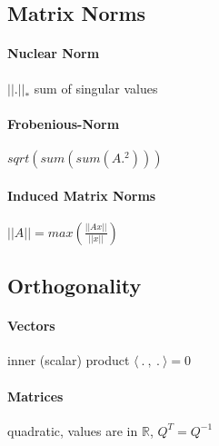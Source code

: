 \documentclass[a4paper,11pt,twocolumn]{article}
\begin{document}
\subsection{Matrix Norms}

\paragraph{Nuclear Norm} $|| . ||_*$ sum of singular values


\paragraph{Frobenious-Norm} $sqrt(sum(sum(A.^2)))$



\paragraph{Induced Matrix Norms}
$ ||A|| = max \left( \frac{ ||Ax|| }{ ||x|| } \right)$

\subsection{Orthogonality}

\paragraph{Vectors} 

inner (scalar) product $\langle ~.~,~.~ \rangle = 0$

\paragraph{Matrices} 

quadratic, values are in $\mathbb{R}$, $Q^T = Q^{-1}$



\end{document}
